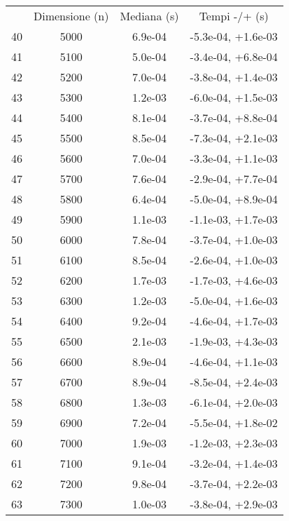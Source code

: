 \begin{table}
\centering
\begin{adjustbox}{width=1\textwidth/2}
\begin{tabular}{|c|c|c|c|}
\hline
 & Dimensione (n) & Mediana (s) & Tempi -/+ (s) \\
40 & 5000 & 6.9e-04 & -5.3e-04, +1.6e-03 \\
\cline{1-4}
41 & 5100 & 5.0e-04 & -3.4e-04, +6.8e-04 \\
\cline{1-4}
42 & 5200 & 7.0e-04 & -3.8e-04, +1.4e-03 \\
\cline{1-4}
43 & 5300 & 1.2e-03 & -6.0e-04, +1.5e-03 \\
\cline{1-4}
44 & 5400 & 8.1e-04 & -3.7e-04, +8.8e-04 \\
\cline{1-4}
45 & 5500 & 8.5e-04 & -7.3e-04, +2.1e-03 \\
\cline{1-4}
46 & 5600 & 7.0e-04 & -3.3e-04, +1.1e-03 \\
\cline{1-4}
47 & 5700 & 7.6e-04 & -2.9e-04, +7.7e-04 \\
\cline{1-4}
48 & 5800 & 6.4e-04 & -5.0e-04, +8.9e-04 \\
\cline{1-4}
49 & 5900 & 1.1e-03 & -1.1e-03, +1.7e-03 \\
\cline{1-4}
50 & 6000 & 7.8e-04 & -3.7e-04, +1.0e-03 \\
\cline{1-4}
51 & 6100 & 8.5e-04 & -2.6e-04, +1.0e-03 \\
\cline{1-4}
52 & 6200 & 1.7e-03 & -1.7e-03, +4.6e-03 \\
\cline{1-4}
53 & 6300 & 1.2e-03 & -5.0e-04, +1.6e-03 \\
\cline{1-4}
54 & 6400 & 9.2e-04 & -4.6e-04, +1.7e-03 \\
\cline{1-4}
55 & 6500 & 2.1e-03 & -1.9e-03, +4.3e-03 \\
\cline{1-4}
56 & 6600 & 8.9e-04 & -4.6e-04, +1.1e-03 \\
\cline{1-4}
57 & 6700 & 8.9e-04 & -8.5e-04, +2.4e-03 \\
\cline{1-4}
58 & 6800 & 1.3e-03 & -6.1e-04, +2.0e-03 \\
\cline{1-4}
59 & 6900 & 7.2e-04 & -5.5e-04, +1.8e-02 \\
\cline{1-4}
60 & 7000 & 1.9e-03 & -1.2e-03, +2.3e-03 \\
\cline{1-4}
61 & 7100 & 9.1e-04 & -3.2e-04, +1.4e-03 \\
\cline{1-4}
62 & 7200 & 9.8e-04 & -3.7e-04, +2.2e-03 \\
\cline{1-4}
63 & 7300 & 1.0e-03 & -3.8e-04, +2.9e-03 \\

\end{tabular}
\end{adjustbox}
\end{table}
